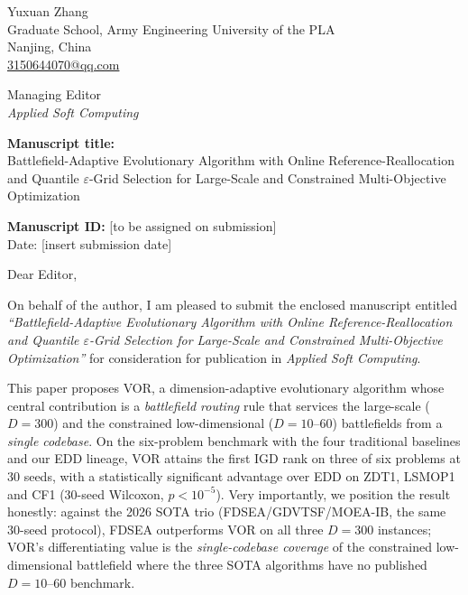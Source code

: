 \documentclass[11pt]{article}
\begin{document}
Yuxuan Zhang\\[6pt]
Graduate School, Army Engineering University of the PLA\\[2pt]
Nanjing, China\\[2pt]
\href{mailto:3150644070@qq.com}{3150644070@qq.com}

\vspace{2em}

Managing Editor\\[2pt]
\emph{Applied Soft Computing}

\vspace{1.5em}

\noindent\textbf{Manuscript title:}\\
Battlefield-Adaptive Evolutionary Algorithm with Online
Reference-Reallocation and Quantile $\varepsilon$-Grid Selection for
Large-Scale and Constrained Multi-Objective Optimization

\noindent\textbf{Manuscript ID:} [to be assigned on submission]\\
Date: [insert submission date]

\vspace{1em}

Dear Editor,

On behalf of the author, I am pleased to submit the enclosed manuscript
entitled \emph{``Battlefield-Adaptive Evolutionary Algorithm with Online
Reference-Reallocation and Quantile $\varepsilon$-Grid Selection for
Large-Scale and Constrained Multi-Objective Optimization''} for
consideration for publication in \emph{Applied Soft Computing}.

This paper proposes \textsc{VOR}, a dimension-adaptive evolutionary
algorithm whose central contribution is a \emph{battlefield routing} rule
that services the large-scale ($D=300$) and the constrained
low-dimensional ($D=10$--$60$) battlefields from a \emph{single
codebase}. On the six-problem benchmark with the four traditional
baselines and our \textsc{EDD} lineage, \textsc{VOR} attains the first
IGD rank on three of six problems at 30 seeds, with a statistically
significant advantage over \textsc{EDD} on \textsc{ZDT1},
\textsc{LSMOP1} and \textsc{CF1} (30-seed Wilcoxon, $p<10^{-5}$).
Very importantly, we position the result honestly: against the 2026
SOTA trio (\textsc{FDSEA}/\textsc{GDVTSF}/\textsc{MOEA-IB}, the same
30-seed protocol), \textsc{FDSEA} outperforms \textsc{VOR} on all three
$D=300$ instances; \textsc{VOR}'s differentiating value is the
\emph{single-codebase coverage} of the constrained low-dimensional
battlefield where the three SOTA algorithms have no published
$D=10$--$60$ benchmark.
\end{document}
